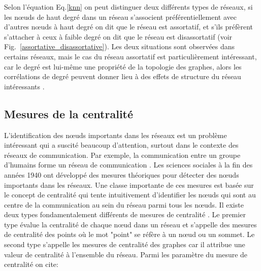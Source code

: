 Selon l'équation Eq.\ref{knn} on peut distinguer deux différents types de réseaux, si les nœuds de haut degré dans un réseau  s'associent préférentiellement avec d'autres nœuds à haut degré on dit que le réseau est assortatif, et s'ils préfèrent  s'attacher à ceux à faible degré on dit que le réseau est disassortatif (voir Fig.~\ref{assortative_disassortative}). Les deux situations sont observées dans certains réseaux, mais le cas du réseau assortatif est particulièrement intéressant, car le degré est lui-même une propriété de la topologie des graphes, alors les corrélations de degré peuvent donner lieu à des effets de structure du réseau intéressants \cite{MS2002,Ne2003}. 

\subsection{Mesures de la centralité}

L'identification des nœuds importants dans les réseaux est un problème intéressant qui a suscité beaucoup d'attention, surtout dans le contexte des réseaux de communication. Par exemple, la communication entre un groupe d'humains forme un réseau de communication \cite{Dehmer2011}. Les sciences sociales à la fin des années 1940 ont développé des mesures théoriques pour détecter des nœuds importants dans les réseaux. Une classe importante de ces mesures est basée sur le concept de centralité \cite{Hage-Harary1995,Wasserman-Faust1994} qui tente intuitivement d'identifier les nœuds qui sont au centre de la communication au sein du réseau parmi tous les nœuds. Il existe deux types fondamentalement différents de mesures de centralité \cite{Freeman1977}. Le premier type évalue la centralité de chaque nœud dans un réseau et s'appelle des mesures de centralité des points où le mot "point" se réfère à un nœud ou un sommet. Le second type s'appelle les mesures de centralité des graphes car il attribue une valeur de centralité à l'ensemble du réseau. Parmi les paramètre du mesure de centralité on cite:\\

